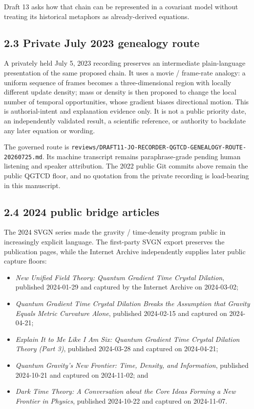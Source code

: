 \documentclass[
  american,
  11pt,
  letterpaper,
]{article}
\providecommand{\tightlist}{%
  \setlength{\itemsep}{0pt}\setlength{\parskip}{0pt}}
\begin{document}
Draft 13 asks how that chain can be represented in a covariant model without treating its historical metaphors as already-derived equations.

\subsection{2.3 Private July 2023 genealogy route}\label{private-july-2023-genealogy-route}

A privately held July 5, 2023 recording preserves an intermediate plain-language presentation of the same proposed chain. It uses a movie / frame-rate analogy: a uniform sequence of frames becomes a three-dimensional region with locally different update density; mass or density is then proposed to change the local number of temporal opportunities, whose gradient biases directional motion. This is authorial-intent and explanation evidence only. It is not a public priority date, an independently validated result, a scientific reference, or authority to backdate any later equation or wording.

The governed route is \nolinkurl{reviews/DRAFT11-JO-RECORDER-QGTCD-GENEALOGY-ROUTE-20260725.md}. Its machine transcript remains paraphrase-grade pending human listening and speaker attribution. The 2022 public Git commits above remain the public QGTCD floor, and no quotation from the private recording is load-bearing in this manuscript.

\subsection{2.4 2024 public bridge articles}\label{public-bridge-articles}

The 2024 SVGN series made the gravity / time-density program public in increasingly explicit language. The first-party SVGN export preserves the publication pages, while the Internet Archive independently supplies later public capture floors:

\begin{itemize}
\tightlist
\item
  \emph{New Unified Field Theory: Quantum Gradient Time Crystal Dilation}, published 2024-01-29 and captured by the Internet Archive on 2024-03-02;
\item
  \emph{Quantum Gradient Time Crystal Dilation Breaks the Assumption that Gravity Equals Metric Curvature Alone}, published 2024-02-15 and captured on 2024-04-21;
\item
  \emph{Explain It to Me Like I Am Six: Quantum Gradient Time Crystal Dilation Theory (Part 3)}, published 2024-03-28 and captured on 2024-04-21;
\item
  \emph{Quantum Gravity's New Frontier: Time, Density, and Information}, published 2024-10-21 and captured on 2024-11-02; and
\item
  \emph{Dark Time Theory: A Conversation about the Core Ideas Forming a New Frontier in Physics}, published 2024-10-22 and captured on 2024-11-07.
\end{itemize}
\end{document}
